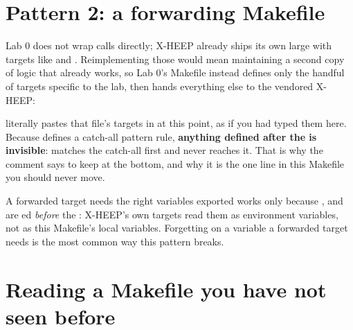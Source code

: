 \section{Pattern 2: a forwarding Makefile}

Lab 0 does not wrap \FuseSoC calls directly; X-HEEP already ships its own
large  with targets like  and
. Reimplementing those would mean maintaining a second copy of
logic that already works, so Lab 0's Makefile instead defines only the
handful of targets specific to the lab, then hands everything else to the
vendored X-HEEP:


 literally pastes that file's targets in
at this point, as if you had typed them here. Because 
defines a catch-all pattern rule, \textbf{anything defined after the
 is invisible}:  matches the catch-all first and
never reaches it. That is why the comment says to keep  at
the bottom, and why it is the one line in this Makefile you should never
move.

\begin{gotcha}{A forwarded target needs the right variables exported}
 works only because ,
 and  are ed \emph{before} the
: X-HEEP's own targets read them as environment variables,
not as this Makefile's local variables. Forgetting  on a
variable a forwarded target needs is the most common way this pattern
breaks.
\end{gotcha}

\section{Reading a Makefile you have not seen before}

